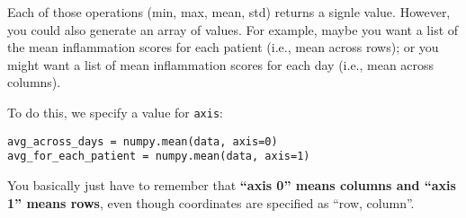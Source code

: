 \begin{multicols*}{2}
Each of those operations (min, max, mean, std) returns a signle value. However, you could also generate an array of values. For example, maybe you want a list of the mean inflammation scores for each patient (i.e., mean across rows); or you might want a list of mean inflammation scores for each day (i.e., mean across columns).

To do this, we specify a value for \texttt{axis}:

\vspace{-4mm}
\begin{verbatim}
avg_across_days = numpy.mean(data, axis=0)
avg_for_each_patient = numpy.mean(data, axis=1)
\end{verbatim}

You basically just have to remember that \textbf{``axis 0'' means columns and ``axis 1'' means rows}, even though coordinates are specified as ``row, column''.

\end{multicols*}